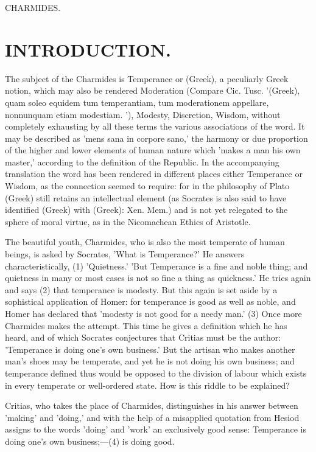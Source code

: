 \documentclass[11pt,letter]{article}
\begin{document}
\par  CHARMIDES.
\section{
      INTRODUCTION.
    }
\par  The subject of the Charmides is Temperance or (Greek), a peculiarly Greek notion, which may also be rendered Moderation (Compare Cic. Tusc. '(Greek), quam soleo equidem tum temperantiam, tum moderationem appellare, nonnunquam etiam modestiam. '), Modesty, Discretion, Wisdom, without completely exhausting by all these terms the various associations of the word. It may be described as 'mens sana in corpore sano,' the harmony or due proportion of the higher and lower elements of human nature which 'makes a man his own master,' according to the definition of the Republic. In the accompanying translation the word has been rendered in different places either Temperance or Wisdom, as the connection seemed to require: for in the philosophy of Plato (Greek) still retains an intellectual element (as Socrates is also said to have identified (Greek) with (Greek): Xen. Mem.) and is not yet relegated to the sphere of moral virtue, as in the Nicomachean Ethics of Aristotle.

\par  The beautiful youth, Charmides, who is also the most temperate of human beings, is asked by Socrates, 'What is Temperance?' He answers characteristically, (1) 'Quietness.' 'But Temperance is a fine and noble thing; and quietness in many or most cases is not so fine a thing as quickness.' He tries again and says (2) that temperance is modesty. But this again is set aside by a sophistical application of Homer: for temperance is good as well as noble, and Homer has declared that 'modesty is not good for a needy man.' (3) Once more Charmides makes the attempt. This time he gives a definition which he has heard, and of which Socrates conjectures that Critias must be the author: 'Temperance is doing one's own business.' But the artisan who makes another man's shoes may be temperate, and yet he is not doing his own business; and temperance defined thus would be opposed to the division of labour which exists in every temperate or well-ordered state. How is this riddle to be explained?

\par  Critias, who takes the place of Charmides, distinguishes in his answer between 'making' and 'doing,' and with the help of a misapplied quotation from Hesiod assigns to the words 'doing' and 'work' an exclusively good sense: Temperance is doing one's own business;—(4) is doing good.
\end{document}
